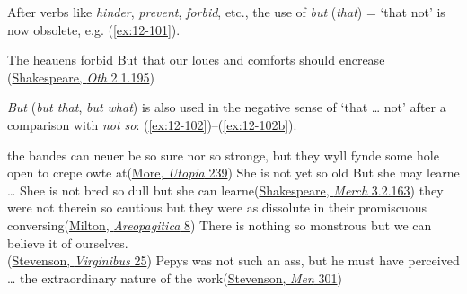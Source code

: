 After verbs like \textit{hinder}, \textit{prevent}, \textit{forbid}, etc., the use of \textit{but} (\textit{that}) = `that not' is now obsolete, e.g. (\ref{ex:12-101}).

\ea \label{ex:12-101}
The heauens forbid But that our loues and comforts should encrease\\\hfill(\href{https://internetshakespeare.uvic.ca/doc/Oth_F1/scene/2.1/index.html#tln-970}{Shakespeare, \textit{Oth} 2.1.195})
\z

\bigskip
\textit{But} (\textit{but that},\textit{ but what}) is also used in the negative sense of `that {\dots} not' after a comparison with \textit{not so}: (\ref{ex:12-102})--(\ref{ex:12-102b}).

\ea \label{ex:12-102}
\ea
the bandes can neuer be so sure nor so stronge, but they wyll fynde some hole open to crepe owte at\hfill(\href{https://archive.org/details/utopiasirthomas00robigoog/page/n349/mode/2up?q=%22bandes+can+neuer%22&view=theater}{More, \textit{Utopia} 239}) %
\ex
She is not yet so old But she may learne {\dots} Shee is not bred so dull but she can learne\hfill(\href{https://internetshakespeare.uvic.ca/doc/MV_F1/scene/3.2/index.html#tln-1505}{Shakespeare, \textit{Merch} 3.2.163})
\ex
they were not therein so cautious but they were as dissolute in their promiscuous conversing\hfill(\href{https://archive.org/details/areopagitica00miltuoft/page/8/mode/2up?q=%22not+therein%22&view=theater}{Milton, \textit{Areopagitica} 8})
\ex
There is nothing so monstrous but we can believe it of ourselves.\\\hfill(\href{https://archive.org/details/buspuerisstevvirginirich/page/26/mode/2up?view=theater&q=%22nothing+so+monstrous%22}{Stevenson, \textit{Virginibus} 25})
\ex
Pepys was not such an ass, but he must have perceived {\dots} the extraordinary nature of the work\hfill(\href{https://archive.org/details/familiarstudies00stevuoft/page/284/mode/2up?view=theater&q=%22Pepys+was+not+such+an+ass%22}{Stevenson, \textit{Men} 301}) %
\z
\z

